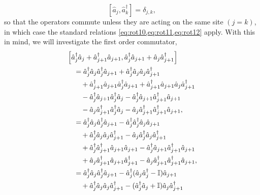 \begin{equation}
	\left[\hat{a}_{j}, \hat{a}_{k}^{\dagger}\right] = \delta_{j,k},
	\label{eq:rot26}
\end{equation}
so that the operators commute unless they are acting on the same site \((j=k)\), in which case the standard relations \cref{eq:rot10,eq:rot11,eq:rot12} apply. With this in mind, we will investigate the first order commutator,
\begin{align}
	 &\left[\hat{a}_{j}^{\dagger}\hat{a}_{j} + \hat{a}_{j+1}^{\dagger}\hat{a}_{j+1}, \hat{a}_{j}^{\dagger}\hat{a}_{j+1} + \hat{a}_{j}\hat{a}_{j+1}^{\dagger}\right] \notag \\
	 &\quad= \hat{a}_{j}^{\dagger}\hat{a}_{j}\hat{a}_{j}^{\dagger}\hat{a}_{j+1} + \hat{a}_{j}^{\dagger}\hat{a}_{j}\hat{a}_{j}\hat{a}_{j+1}^{\dagger} \notag \\
	 &\qquad + \hat{a}_{j+1}^{\dagger}\hat{a}_{j+1}\hat{a}_{j}^{\dagger}\hat{a}_{j+1} + \hat{a}_{j+1}^{\dagger}\hat{a}_{j+1}\hat{a}_{j}\hat{a}_{j+1}^{\dagger} \notag \\
	 &\qquad - \hat{a}_{j}^{\dagger}\hat{a}_{j+1}\hat{a}_{j}^{\dagger}\hat{a}_{j} - \hat{a}_{j}^{\dagger}\hat{a}_{j+1}\hat{a}_{j+1}^{\dagger}\hat{a}_{j+1} \notag \\
	 &\qquad - \hat{a}_{j}\hat{a}_{j+1}^{\dagger}\hat{a}_{j}^{\dagger}\hat{a}_{j} - \hat{a}_{j}\hat{a}_{j+1}^{\dagger}\hat{a}_{j+1}^{\dagger}\hat{a}_{j+1}, \notag \\
	 &\quad= \hat{a}_{j}^{\dagger}\hat{a}_{j}\hat{a}_{j}^{\dagger}\hat{a}_{j+1} - \hat{a}_{j}^{\dagger}\hat{a}_{j}^{\dagger}\hat{a}_{j}\hat{a}_{j+1} \notag \\
	 &\qquad + \hat{a}_{j}^{\dagger}\hat{a}_{j}\hat{a}_{j}\hat{a}_{j+1}^{\dagger} - \hat{a}_{j}\hat{a}_{j}^{\dagger}\hat{a}_{j}\hat{a}_{j+1}^{\dagger} \notag \\
	 &\qquad + \hat{a}_{j}^{\dagger}\hat{a}_{j+1}^{\dagger}\hat{a}_{j+1}\hat{a}_{j+1} - \hat{a}_{j}^{\dagger}\hat{a}_{j+1}\hat{a}_{j+1}^{\dagger}\hat{a}_{j+1} \notag \\
	 &\qquad + \hat{a}_{j}\hat{a}_{j+1}^{\dagger}\hat{a}_{j+1}\hat{a}_{j+1}^{\dagger} - \hat{a}_{j}\hat{a}_{j+1}^{\dagger}\hat{a}_{j+1}^{\dagger}\hat{a}_{j+1}, \notag \\
	 &\quad= \hat{a}_{j}^{\dagger}\hat{a}_{j}\hat{a}_{j}^{\dagger}\hat{a}_{j+1} - \hat{a}_{j}^{\dagger}(\hat{a}_{j}\hat{a}_{j}^{\dagger} - \mathbb{I})\hat{a}_{j+1} \notag \\
	 &\qquad + \hat{a}_{j}^{\dagger}\hat{a}_{j}\hat{a}_{j}\hat{a}_{j+1}^{\dagger} - (\hat{a}_{j}^{\dagger}\hat{a}_{j} + \mathbb{I})\hat{a}_{j}\hat{a}_{j+1}^{\dagger} \notag \\

\end{align}
